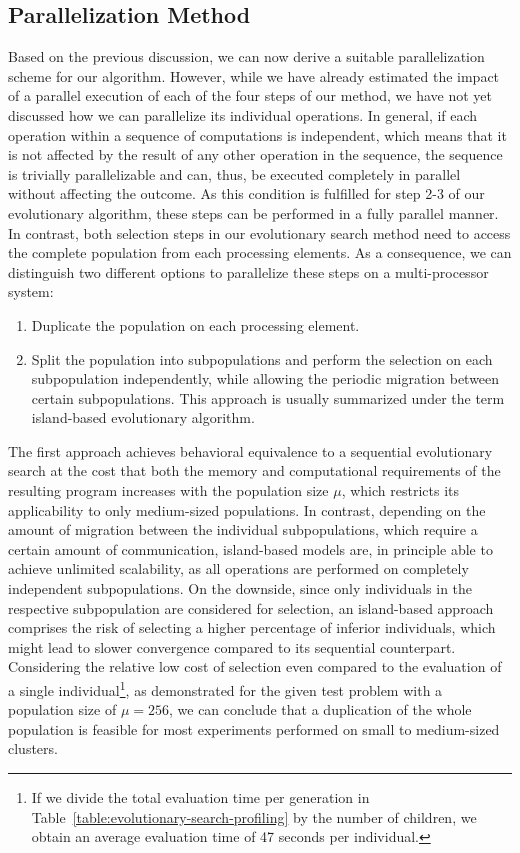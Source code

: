 \subsection{Parallelization Method}
Based on the previous discussion, we can now derive a suitable parallelization scheme for our algorithm.
However, while we have already estimated the impact of a parallel execution of each of the four steps of our method, we have not yet discussed how we can parallelize its individual operations. 
In general, if each operation within a sequence of computations is independent, which means that it is not affected by the result of any other operation in the sequence, the sequence is trivially parallelizable and can, thus, be executed completely in parallel without affecting the outcome.
As this condition is fulfilled for step 2-3 of our evolutionary algorithm, these steps can be performed in a fully parallel manner.
In contrast, both selection steps in our evolutionary search method need to access the complete population from each processing elements.
As a consequence, we can distinguish two different options to parallelize these steps on a multi-processor system:
\begin{enumerate}
	\item Duplicate the population on each processing element.
	\item Split the population into subpopulations and perform the selection on each subpopulation independently, while allowing the periodic migration between certain subpopulations. This approach is usually summarized under the term island-based evolutionary algorithm.
\end{enumerate}   
The first approach achieves behavioral equivalence to a sequential evolutionary search at the cost that both the memory and computational requirements of the resulting program increases with the population size $\mu$, which restricts its applicability to only medium-sized populations.
In contrast, depending on the amount of migration between the individual subpopulations, which require a certain amount of communication, island-based models are, in principle able to achieve unlimited scalability, as all operations are performed on completely independent subpopulations.
On the downside, since only individuals in the respective subpopulation are considered for selection, an island-based approach comprises the risk of selecting a higher percentage of inferior individuals, which might lead to slower convergence compared to its sequential counterpart.
Considering the relative low cost of selection even compared to the evaluation of a single individual\footnote{If we divide the total evaluation time per generation in Table~\ref{table:evolutionary-search-profiling} by the number of children, we obtain an average evaluation time of 47 seconds per individual.}, as demonstrated for the given test problem with a population size of $\mu = 256$, we can conclude that a duplication of the whole population is feasible for most experiments performed on small to medium-sized clusters.
